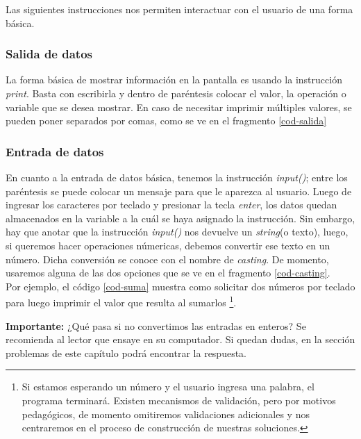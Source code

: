 Las siguientes instrucciones nos permiten interactuar con el usuario de una forma básica.

\subsubsection{Salida de datos}

La forma básica de mostrar información en la pantalla es usando la instrucción \emph{print}. Basta con escribirla y dentro de paréntesis colocar el valor, la operación o variable que se desea mostrar. En caso de necesitar imprimir múltiples valores, se pueden poner separados por comas, como se ve en el fragmento \ref{cod-salida} \\

\newpage


\subsubsection{Entrada de datos}

En cuanto a la entrada de datos básica, tenemos la instrucción \emph{input()}; entre los paréntesis se puede colocar un mensaje para que le aparezca al usuario. Luego de ingresar los caracteres por teclado y presionar la tecla \emph{enter}, los datos quedan almacenados en la variable a la cuál se haya asignado la instrucción. Sin embargo, hay que anotar que la instrucción \emph{input()} nos devuelve un \emph{string}(o texto), luego, si queremos hacer operaciones númericas, debemos convertir ese texto en un número. Dicha conversión se conoce con el nombre de \emph{casting}. De momento, usaremos alguna de las dos opciones que se ve en el fragmento \ref{cod-casting}. \\



Por ejemplo, el código \ref{cod-suma} muestra como solicitar dos números por teclado para luego imprimir el valor que resulta al sumarlos \footnote{Si estamos esperando un número y el usuario ingresa una palabra, el programa terminará. Existen mecanismos de validación, pero por motivos pedagógicos, de momento omitiremos validaciones adicionales y nos centraremos en el proceso de construcción de nuestras soluciones.}. 

\textbf{Importante:} ¿Qué pasa si no convertimos las entradas en enteros? Se recomienda al lector que ensaye en su computador. Si quedan dudas, en la sección problemas de este capítulo podrá encontrar la respuesta. \\


